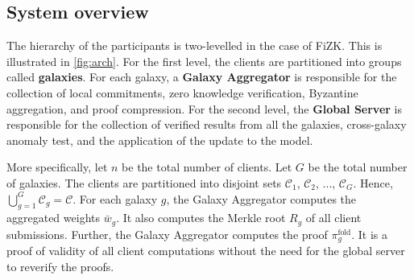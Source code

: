 \documentclass[10pt,twocolumn,letterpaper]{article}
\begin{document}
\subsection{System overview}
\label{sec:arch}


The hierarchy of the participants is two-levelled in the case of FiZK. This is illustrated in \cref{fig:arch}. For the first level, the clients are partitioned into groups called \textbf{galaxies}. For each galaxy, a \textbf{Galaxy Aggregator} is responsible for the collection of local commitments, zero knowledge verification, Byzantine aggregation, and proof compression. For the second level, the \textbf{Global Server} is responsible for the collection of verified results from all the galaxies, cross-galaxy anomaly test, and the application of the update to the model.

More specifically, let $n$ be the total number of clients. Let $G$ be the total number of galaxies. The clients are partitioned into disjoint sets $\mathcal{C}_1$, $\mathcal{C}_2$, ..., $\mathcal{C}_G$. Hence, $\bigcup_{g=1}^{G} \mathcal{C}_g = \mathcal{C}$. For each galaxy $g$, the Galaxy Aggregator computes the aggregated weights $\bar{w}_g$. It also computes the Merkle root $R_g$ of all client submissions. Further, the Galaxy Aggregator computes the proof $\pi_g^{\mathrm{fold}}$. It is a proof of validity of all client computations without the need for the global server to reverify the proofs.
\end{document}
